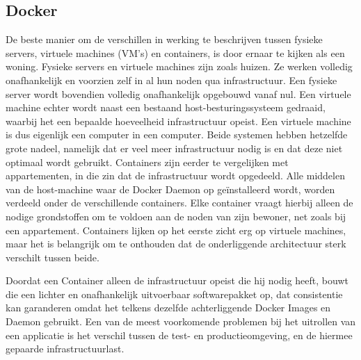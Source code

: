 \subsection{Docker}
\label{sec:docker-uitleg}
De beste manier om de verschillen in werking te beschrijven tussen fysieke servers, virtuele machines (VM’s) en containers, is door ernaar te kijken als een woning. Fysieke servers en virtuele machines zijn zoals huizen. Ze werken volledig onafhankelijk en voorzien zelf in al hun noden qua infrastructuur. Een fysieke server wordt bovendien volledig onafhankelijk opgebouwd vanaf nul. Een virtuele machine echter wordt naast een bestaand host-besturingssysteem gedraaid, waarbij het een bepaalde hoeveelheid infrastructuur opeist. Een virtuele machine is dus eigenlijk een computer in een computer. Beide systemen hebben hetzelfde grote nadeel, namelijk dat er veel meer infrastructuur nodig is en dat deze niet optimaal wordt gebruikt. Containers zijn eerder te vergelijken met appartementen, in die zin dat de infrastructuur wordt opgedeeld. Alle middelen van de host-machine waar de Docker Daemon op geïnstalleerd wordt, worden verdeeld onder de verschillende containers. Elke container vraagt hierbij alleen de nodige grondstoffen om te voldoen aan de noden van zijn bewoner, net zoals bij een appartement. Containers lijken op het eerste zicht erg op virtuele machines, maar het is belangrijk om te onthouden dat de onderliggende architectuur sterk verschilt tussen beide.

Doordat een Container alleen de infrastructuur opeist die hij nodig heeft, bouwt die een lichter en onafhankelijk uitvoerbaar softwarepakket op, dat consistentie kan garanderen omdat het telkens dezelfde achterliggende Docker Images en Daemon gebruikt. Een van de meest voorkomende problemen bij het uitrollen van een applicatie is het verschil tussen de test- en productieomgeving, en de hiermee gepaarde infrastructuurlast. \autocite{Uhrig2014}

